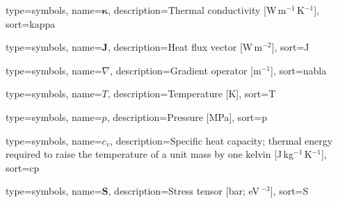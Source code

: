 

{
    type=symbols,
    name=$\boldsymbol{\kappa}$,
    description={Thermal conductivity [W\,m$^{-1}$\,K$^{-1}$]},
    sort=kappa
}

{
    type=symbols,
    name=$\boldsymbol{J}$,
    description={Heat flux vector [W\,m$^{-2}$]},
    sort=J
}

{
    type=symbols,
    name=$\nabla$,
    description={Gradient operator [m$^{-1}$]},
    sort=nabla
}

{
    type=symbols,
    name=$T$,
    description={Temperature [K]},
    sort=T
}

{
    type=symbols,
    name=$p$,
    description={Pressure [MPa]},
    sort=p
}

{
    type=symbols,
    name=$c_v$,
    description={Specific heat capacity; thermal energy required to raise the
        temperature of a unit mass by one kelvin
        [J\,kg$^{-1}$\,K$^{-1}$]},
    sort=cp
}

{
    type=symbols,
    name=$\boldsymbol{S}$,
    description={Stress tensor [bar;\; eV\,\text{\AA}$^{-3}$]},
    sort=S
}